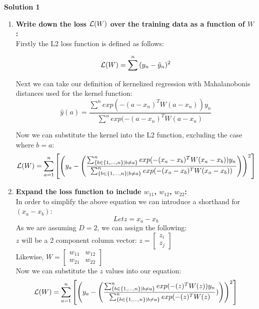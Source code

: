 \documentclass[submit]{harvardml}
\begin{document}
\newpage


\textbf{Solution 1}
\begin{enumerate}
    \item \textbf{Write down the loss $\mathcal{L}(W)$ over the training data as a function of $W$:}\\
    
    Firstly the L2 loss function is defined as follows:
    
    $$
        \mathcal{L}(W) = \sum^{n}{(y_n - \hat{y}_n)^2}
    $$
    
    Next we can take our definition of kernelized regression with Mahalanobonis distances used for the kernel function:
    $$
        \hat{y}(a)= \frac{\sum^n exp(-(a -x_n)^T W(a - x_n)) y_n}
                        {\sum^n exp(-(a -x_n)^T W(a - x_n)}
    $$
    
    Now we can substitute the kernel into the L2 function, excluding the case where $b=a$:
    $$
        \mathcal{L}(W) =  \sum^{n}_{a = 1}{\left[
            \left(y_a - \left( \frac  {\sum^n_{\{b\in \{1, ...,n\} | b \neq a\}} exp(-(x_a -x_b)^T W(x_a - x_b)) y_n}
                            {\sum^n_{\{b\in \{1, ...,n\} | b \neq a\}} exp(-(x_a -x_b)^T W(x_a - x_b))}\right)
            \right)^2
        \right]}
    $$
    
    \item \textbf{Expand the loss function to include $w_{11}$, $w_{12}$, $w_{22}$:}\\
    
    In order to simplify the above equation we can introduce a shorthand for $(x_a - x_b)$:
    $$ Let z = x_a - x_b $$
    As we are assuming $D = 2$, we can  assign the following:\\
    $z$ will be a 2 component column vector: 
    $z = 
    \begin{bmatrix}
        z_i \\ 
        z_j 
    \end{bmatrix}$ \\
    
    Likewise, $W = 
    \begin{bmatrix}
        w_{11} & w_{12} \\
        w_{21} & w_{22}
    \end{bmatrix}$\\
    
    Now we can substitute the $z$ values into our equation:
    $$
        \mathcal{L}(W) = \sum^{n}_{a = 1}{\left[
            \left(y_a - \left( \frac  {\sum^n_{\{b\in \{1, ...,n\} | b \neq a\}} exp(-(z)^T W(z)) y_n}
                            {\sum^n_{\{b\in \{1, ...,n\} | b \neq a\}} exp(-(z)^T W(z)})\right)
            \right)^2
        \right]}
    $$
    

\end{enumerate}
\end{document}
